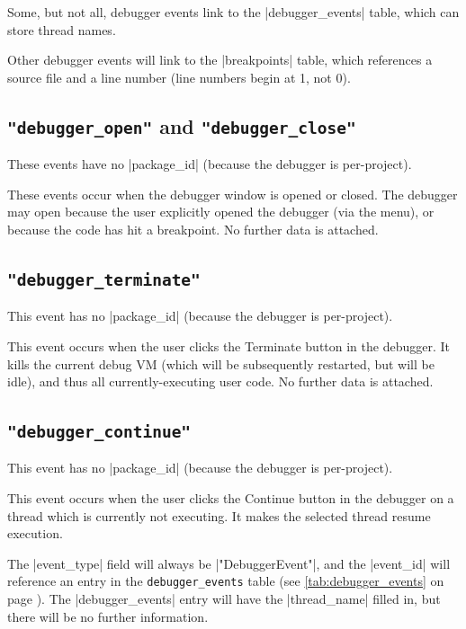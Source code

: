 \documentclass{report}
\newcommand{\myref}[1]{\autoref{#1} on page \pageref*{#1}}
\newcommand{\tabref}[1]{\lstinline|#1| table (see \myref{tab:#1})}
\newcommand{\intern}{This table may be interned, see \myref{def:intern}.}
\begin{document}
Some, but not all, debugger events link to the |debugger_events|
table, which can store thread names.


Other debugger events will link to the |breakpoints| table, which references a
source file and a line number (line numbers begin at 1, not 0).


\subsection{\lstinline!"debugger_open"! and \lstinline!"debugger_close"!}

These events have no |package_id| (because the debugger is per-project).

These events occur when the debugger window is opened or closed.  The debugger
may open because the user explicitly opened the debugger (via the menu), or
because the code has hit a breakpoint.  No further data is attached.

\subsection{\lstinline!"debugger_terminate"!}

This event has no |package_id| (because the debugger is per-project).

This event occurs when the user clicks the Terminate button in the debugger.
It kills the current debug VM (which will be subsequently restarted, but will
be idle), and thus all currently-executing user code.  No
further data is attached.

\subsection{\lstinline!"debugger_continue"!}

This event has no |package_id| (because the debugger is per-project).

This event occurs when the user clicks the Continue button in the debugger on
a thread which is currently not executing.
It makes the selected thread resume execution.  

The |event_type| field will always be |"DebuggerEvent"|, and the |event_id| will
reference an entry in the \tabref{debugger_events}.  The |debugger_events|
entry will have the |thread_name| filled in, but there will be no further information.
\end{document}
